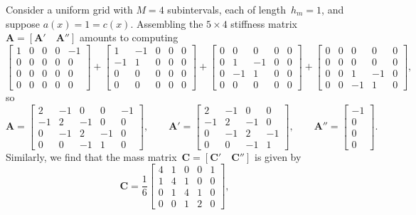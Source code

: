\begin{example}
Consider a uniform grid with $M=4$ subintervals, each of length~$h_m=1$,
and suppose $a(x)=1=c(x)$. Assembling the $5\times4$ stiffness 
matrix~$\boldsymbol{A}=[\boldsymbol{A}'\quad\boldsymbol{A}'']$ amounts 
to computing
\[
\left[
\begin{array}{cccc|c}1&0&0&0&-1\\0&0&0&0&0\\0&0&0&0&0\\0&0&0&0&0\end{array}
\right]+\left[
\begin{array}{cccc|c}1&-1&0&0&0\\-1&1&0&0&0\\0&0&0&0&0\\0&0&0&0&0\end{array}
\right]+\left[
\begin{array}{cccc|c}0&0&0&0&0\\0&1&-1&0&0\\0&-1&1&0&0\\0&0&0&0&0\end{array}
\right]+\left[
\begin{array}{cccc|c}0&0&0&0&0\\0&0&0&0&0\\0&0&1&-1&0\\0&0&-1&1&0\end{array}
\right],
\]
so
\[
\boldsymbol{A}=\left[\begin{array}{cccc|c}
2&-1&0&0&-1\\ -1&2&-1&0&0\\ 0&-1&2&-1&0\\ 0&0&-1&1&0\end{array}\right],\qquad
\boldsymbol{A}'=\begin{bmatrix}
2&-1&0&0\\ -1&2&-1&0\\ 0&-1&2&-1\\ 0&0&-1&1\end{bmatrix},\qquad
\boldsymbol{A}''=\begin{bmatrix}-1\\ 0\\ 0\\ 0\end{bmatrix}.
\]
Similarly, we find that the mass 
matrix~$\boldsymbol{C}=[\boldsymbol{C}'\quad\boldsymbol{C}'']$ is given by
\[
\boldsymbol{C}=\frac{1}{6}\left[\begin{array}{cccc|c}
4&1&0&0&1\\ 1&4&1&0&0\\ 0&1&4&1&0\\ 0&0&1&2&0\end{array}\right],\qquad
\]
\end{example}
